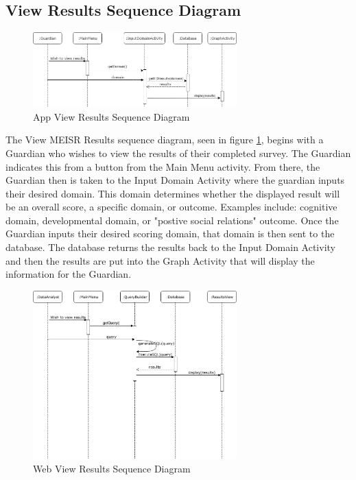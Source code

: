 \subsection{View Results Sequence Diagram}
\begin{figure}[H]
  \centering
  \includegraphics[width=0.7\textwidth]{images/ViewMEISRResultsSequenceDiagram.png}
  \caption{App View Results Sequence Diagram}
  \label{fig:appViewResultsSD}
\end{figure}

	The View MEISR Results sequence diagram, seen in figure \ref{fig:appViewResultsSD}, begins with a Guardian who wishes to view the results of their completed survey. The Guardian indicates this from a button from the Main Menu activity. From there, the Guardian then is taken to the Input Domain Activity where the guardian inputs their desired domain. This domain determines whether the displayed result will be an overall score, a specific domain, or outcome. Examples include: cognitive domain, developmental domain, or "postive social relations" outcome. Once the Guardian inputs their desired scoring domain, that domain is then sent to the database. The database returns the results back to the Input Domain Activity and then the results are put into the Graph Activity that will display the information for the Guardian.

\begin{figure}[H]
  \centering
  \includegraphics[width=0.7\textwidth]{images/ViewResultsSequenceDiagram.png}
  \caption{Web View Results Sequence Diagram}
  \label{fig:webViewResultsSD}
\end{figure}


